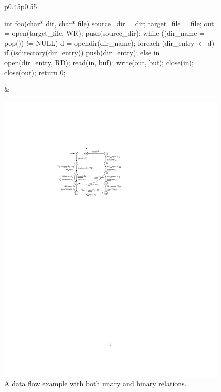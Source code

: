 \begin{figure}[t]
  \hspace*{-5mm}
  \begin{tabular}{p{0.45\textwidth}p{0.55\textwidth}}
    \begin{minipage}{\linewidth}
\begin{pseudoctiny} int foo(char* dir, char* file) {
  source_dir = dir; target_file = file; out = open(target_file, WR);
  push(source_dir); while ((dir_name = pop()) != NULL) {
    d = opendir(dir_name); foreach (dir_entry $\in$ d) {
      if (isdirectory(dir_entry))
        push(dir_entry); else {
        in = open(dir_entry, RD); read(in, buf); write(out, buf);
        close(in);
      } }
  } close(out); return 0;
}
\end{pseudoctiny}
    \end{minipage} & \hspace*{-10mm}
    \begin{minipage}{\linewidth}
      \begin{flushright}
        \includegraphics{figures/host/improving/rels}
      \end{flushright}
    \end{minipage}
  \end{tabular}
  \caption{A data flow example with both unary and binary relations.}
  \label{fig:rels}
\end{figure}

